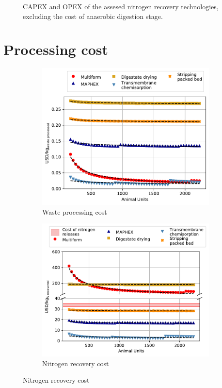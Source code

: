 \begin{refsection}[referencesApD]
\begin{figure}[h!]
	\caption{CAPEX and OPEX of the assesed nitrogen recovery technologies, excluding the cost of anaerobic digestion stage.} \label{fig:CAPEXOPEX_NoAD}
\end{figure}

\section{Processing cost}
\begin{figure}[h!]
	\centering 
	\begin{subfigure}[t]{0.8\textwidth}
		\centering
		\includegraphics[width=1\linewidth, trim={0cm 0cm 0cm 0cm},clip]{gfx/AppendixD/ScaleUp2WasteProcCost_NoAD.pdf} 
		\caption{Waste processing cost}
		\label{fig:ScaleUp2WasteProcCost_NoAD}
	\end{subfigure}

	\bigskip

	\begin{subfigure}[t]{0.8\textwidth}
		\centering
		\includegraphics[width=1\linewidth, trim={0cm 0cm 0cm 0cm},clip]{gfx/AppendixD/ScaleUp2_NoAD.pdf} 
		\caption{Nitrogen recovery cost}
		\label{fig:ScaleUp2_NoAD}
	\end{subfigure}
	

\end{figure}
\end{refsection}
